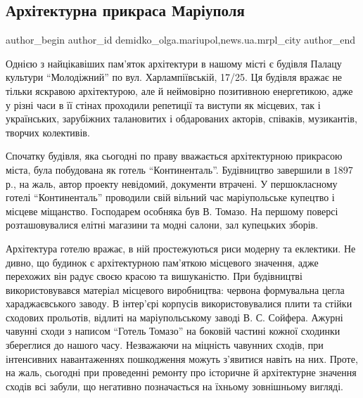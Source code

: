  
 
 
 
 
 
\subsection{Архітектурна прикраса Маріуполя}
\label{sec:05_02_2018.stz.news.ua.mrpl_city.1.arhitekturna_prykrasa_mariupolja}
 
\ifcmt
 author_begin
   author_id demidko_olga.mariupol,news.ua.mrpl_city
 author_end
\fi


Однією з найцікавіших пам'яток архітектури в нашому місті є будівля Палацу
культури \enquote{Молодіжний} по вул. Харлампіївській, 17/25. Ця будівля вражає не
тільки яскравою архітектурою, але й неймовірно позитивною енергетикою, адже у
різні часи в її стінах проходили репетиції та виступи як місцевих, так і
українських, зарубіжних талановитих і обдарованих акторів, співаків,
музикантів, творчих колективів.

Спочатку будівля, яка сьогодні по праву вважається архітектурною прикрасою
міста, була побудована як готель \enquote{Континенталь}. Будівництво завершили в 1897
р., на жаль, автор проекту невідомий, документи втрачені. У першокласному
готелі \enquote{Континенталь} проводили свій вільний час маріупольське купецтво і
місцеве міщанство. Господарем особняка був В. Томазо. На першому поверсі
розташовувалися елітні магазини та модні салони, зал купецьких зборів.


Архітектура готелю вражає, в ній простежуються риси модерну та еклектики. Не
дивно, що будинок є архітектурною пам'яткою місцевого значення, адже перехожих
він радує своєю красою та вишуканістю. При будівництві використовувався
матеріал місцевого виробництва: червона формувальна цегла хараджаєвського
заводу. В інтер'єрі корпусів використовувалися плити та стійки сходових
прольотів, відлиті на маріупольському заводі В. С. Сойфера. Ажурні чавунні сходи
з написом \enquote{Готель Томазо} на боковій частині кожної сходинки збереглися до
нашого часу. Незважаючи на міцність чавунних сходів, при інтенсивних
навантаженнях пошкодження можуть з'явитися навіть на них. Проте, на жаль,
сьогодні при проведенні ремонту про історичне й архітектурне значення сходів
всі забули, що негативно позначається на їхньому зовнішньому вигляді.

